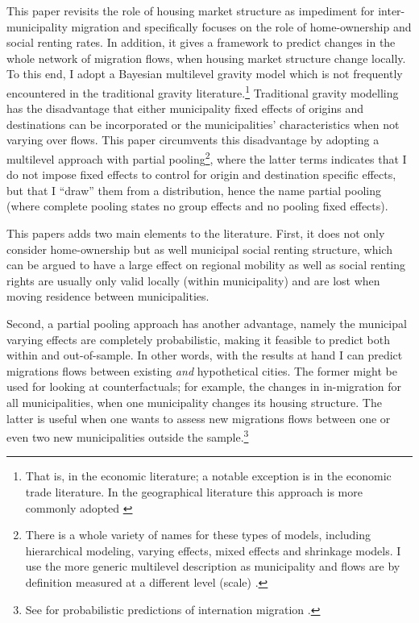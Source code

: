 \documentclass[fleqn,10pt]{SelfArx} %
\begin{document}
        This paper revisits the role of housing market structure
        as impediment for inter-municipality migration and specifically
        focuses on the role of home-ownership and social renting
        rates. In addition, it gives a framework to predict changes 
        in the whole network of migration flows, when housing market structure change locally. 
        To this end, I adopt a Bayesian multilevel gravity model
        which is not frequently encountered in the traditional gravity 
        literature.\footnote{That is, in the economic literature; a
          notable exception is \citet{ranjan2007bayesian} in the
          economic trade literature. In the geographical literature
          this approach is more commonly adopted \citep[see within a
          migration context][]{congdon2010random,
            congdon2012spatial}} Traditional gravity modelling has
        the disadvantage that either municipality fixed effects of origins
        and destinations can be incorporated or the municipalities'
        characteristics when not varying over flows. This paper
        circumvents this disadvantage by adopting a multilevel
        approach with partial pooling\footnote{There is a whole
          variety of names for these types of models, including
          hierarchical modeling, varying effects, mixed effects and
          shrinkage models. I use the more generic multilevel
          description as municipality and flows are by definition measured
          at a different level (scale) \citep[see][for an indepth discussion]{gelman2013bayesian}.}, where the latter terms
        indicates that I do not impose fixed effects to control for
        origin and destination specific effects, but that I ``draw''
        them from a distribution, hence the name partial pooling
        (where complete pooling states no group effects and no pooling
        fixed effects).
               
        This papers adds two main elements to the literature. First, it does not
        only consider home-ownership but as well municipal social renting
        structure, which can be argued \citep[see, e.g.,][]{hughes1981council, boyle1997public,boyle1998migration}
         to have a large effect on regional mobility as well
        as social renting rights are usually only valid locally (within
        municipality) and are lost when moving residence between municipalities.
        
        Second, a partial pooling approach has another advantage, namely the
        municipal varying effects are completely probabilistic, making it
        feasible to predict both within and out-of-sample. In other words, with
        the results at hand I can predict migrations flows between existing
        \emph{and} hypothetical cities. The former might be used for looking at
        counterfactuals; for example, the changes in in-migration for all
        municipalities, when one municipality changes its housing structure. The
        latter is useful when one wants to assess new migrations flows between
        one or even two new municipalities outside the sample.\footnote{See for
          probabilistic predictions of internation migration
          \cite{azose2015bayesian}.}
	
\end{document}
